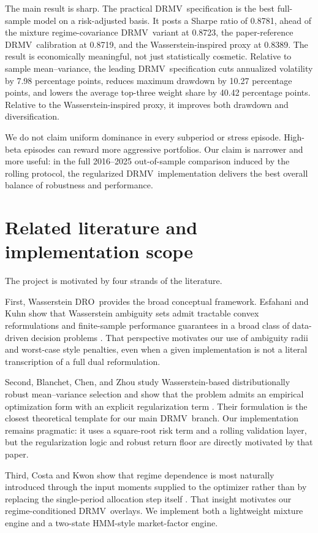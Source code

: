 \documentclass[11pt]{article}
\newcommand{\DRMV}{\ensuremath{\mathrm{DRMV}}}
\newcommand{\DRO}{\ensuremath{\mathrm{DRO}}}
\newcommand{\HMM}{\ensuremath{\mathrm{HMM}}}
\begin{document}
The main result is sharp. The practical \DRMV\ specification is the best full-sample model on a risk-adjusted basis. It posts a Sharpe ratio of 0.8781, ahead of the mixture regime-covariance \DRMV\ variant at 0.8723, the paper-reference \DRMV\ calibration at 0.8719, and the Wasserstein-inspired proxy at 0.8389. The result is economically meaningful, not just statistically cosmetic. Relative to sample mean--variance, the leading \DRMV\ specification cuts annualized volatility by 7.98 percentage points, reduces maximum drawdown by 10.27 percentage points, and lowers the average top-three weight share by 40.42 percentage points. Relative to the Wasserstein-inspired proxy, it improves both drawdown and diversification.

We do not claim uniform dominance in every subperiod or stress episode. High-beta episodes can reward more aggressive portfolios. Our claim is narrower and more useful: in the full 2016--2025 out-of-sample comparison induced by the rolling protocol, the regularized \DRMV\ implementation delivers the best overall balance of robustness and performance.

\section{Related literature and implementation scope}

The project is motivated by four strands of the literature.

First, Wasserstein \DRO\ provides the broad conceptual framework. Esfahani and Kuhn show that Wasserstein ambiguity sets admit tractable convex reformulations and finite-sample performance guarantees in a broad class of data-driven decision problems \cite{EsfahaniKuhn2018}. That perspective motivates our use of ambiguity radii and worst-case style penalties, even when a given implementation is not a literal transcription of a full dual reformulation.

Second, Blanchet, Chen, and Zhou study Wasserstein-based distributionally robust mean--variance selection and show that the problem admits an empirical optimization form with an explicit regularization term \cite{BlanchetChenZhou2022}. Their formulation is the closest theoretical template for our main \DRMV\ branch. Our implementation remains pragmatic: it uses a square-root risk term and a rolling validation layer, but the regularization logic and robust return floor are directly motivated by that paper.

Third, Costa and Kwon show that regime dependence is most naturally introduced through the input moments supplied to the optimizer rather than by replacing the single-period allocation step itself \cite{CostaKwon2020}. That insight motivates our regime-conditioned \DRMV\ overlays. We implement both a lightweight mixture engine and a two-state \HMM-style market-factor engine.
\end{document}
